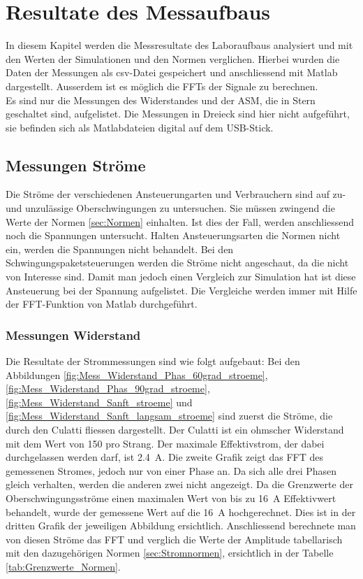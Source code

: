 \section{Resultate des Messaufbaus}
In diesem Kapitel werden die Messresultate des Laboraufbaus analysiert und mit den Werten der Simulationen und den Normen verglichen. Hierbei wurden die Daten der Messungen als csv-Datei gespeichert und anschliessend mit Matlab dargestellt. Ausserdem ist es möglich die FFTs der Signale zu berechnen.\\
Es sind nur die Messungen des Widerstandes und der ASM, die in Stern geschaltet sind, aufgelistet. Die Messungen in Dreieck sind hier nicht aufgeführt, sie  befinden sich als Matlabdateien digital auf dem USB-Stick. 


\newpage
\subsection{Messungen Ströme}
Die Ströme der verschiedenen Ansteuerungarten und Verbrauchern sind auf zu- und unzulässige Oberschwingungen zu untersuchen. Sie müssen zwingend die Werte der Normen \ref{sec:Normen} einhalten. Ist dies der Fall, werden anschliessend noch die Spannungen untersucht. Halten Ansteuerungsarten die Normen nicht ein, werden die Spannungen nicht behandelt. Bei den Schwingungspaketsteuerungen werden die Ströme nicht angeschaut, da die nicht von Interesse sind. Damit man jedoch einen Vergleich zur Simulation hat ist diese Ansteuerung bei der Spannung aufgelistet. Die Vergleiche werden immer mit Hilfe der FFT-Funktion von Matlab durchgeführt. 

\subsubsection{Messungen Widerstand}

Die Resultate der Strommessungen sind wie folgt aufgebaut: Bei den Abbildungen \ref{fig:Mess_Widerstand_Phas_60grad_stroeme}, \ref{fig:Mess_Widerstand_Phas_90grad_stroeme}, \ref{fig:Mess_Widerstand_Sanft_stroeme} und \ref{fig:Mess_Widerstand_Sanft_langsam_stroeme} sind zuerst die Ströme, die durch den Culatti fliessen dargestellt. Der Culatti ist ein ohmscher Widerstand mit dem Wert von \SI{150}{\Omega} pro Strang. Der maximale Effektivstrom, der dabei durchgelassen werden darf, ist \SI{2.4}{A}. Die zweite Grafik zeigt das FFT des gemessenen Stromes, jedoch nur von einer Phase an. Da sich alle drei Phasen gleich verhalten, werden die anderen zwei nicht angezeigt. Da die Grenzwerte der Oberschwingungsströme einen maximalen Wert von bis zu \SI{16}{A} Effektivwert behandelt, wurde der gemessene Wert auf die \SI{16}{A} hochgerechnet. Dies ist in der dritten Grafik der jeweiligen Abbildung ersichtlich. Anschliessend berechnete man von diesen Ströme das FFT und verglich die Werte der Amplitude tabellarisch mit den dazugehörigen Normen \ref{sec:Stromnormen}, ersichtlich in der Tabelle \ref{tab:Grenzwerte_Normen}.

